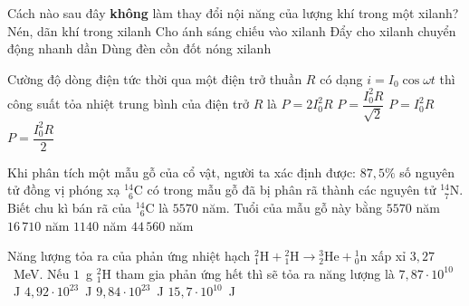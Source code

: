	\begin{ex}%
		Cách nào sau đây \textbf{không} làm thay đổi nội năng của lượng khí trong một xilanh?
		\choice
		{Nén, dãn khí trong xilanh}
		{Cho ánh sáng chiếu vào xilanh}
		{\True Đẩy cho xilanh chuyển động nhanh dần}
		{Dùng đèn cồn đốt nóng xilanh}
	\end{ex}

	\begin{ex}%
		Cường độ dòng điện tức thời qua một điện trở thuần $R$ có dạng $i=I_0\cos\omega t$ thì công suất tỏa nhiệt trung bình của điện trở $R$ là
		\choice
		{$P=2I_0^2R$}
		{$P=\dfrac{I_0^2R}{\sqrt{2}}$}
		{$P=I_0^2R$}
		{\True $P=\dfrac{I_0^2R}{2}$}
	\end{ex}

	\begin{ex}%
		Khi phân tích một mẫu gỗ của cổ vật, người ta xác định được: $87{,}5\%$ số nguyên tử đồng vị phóng xạ ${}^{14}_{\phantom{1}6}\text{C}$ có trong mẫu gỗ đã bị phân rã thành các nguyên tử ${}^{14}_{\phantom{1}7}\text{N}$. Biết chu kì bán rã của ${}^{14}_{\phantom{1}6}\text{C}$ là $5570$ năm. Tuổi của mẫu gỗ này bằng
		\choice
		{$5570$ năm}
		{\True $16\,710$ năm}
		{$1140$ năm}
		{$44\,560$ năm}
	\end{ex}

	\begin{ex}%
		Năng lượng tỏa ra của phản ứng nhiệt hạch ${}^2_1\text{H}+{}^2_1\text{H}\to{}^3_2\text{He}+{}^1_0\text{n}$ xấp xỉ $3{,}27$~MeV. Nếu $1$~g ${}^2_1\text{H}$ tham gia phản ứng hết thì sẽ tỏa ra năng lượng là
		\choice
		{\True $7{,}87\cdot 10^{10}$~J}
		{$4{,}92\cdot 10^{23}$~J}
		{$9{,}84\cdot 10^{23}$~J}
		{$15{,}7\cdot 10^{10}$~J}
	\end{ex}

